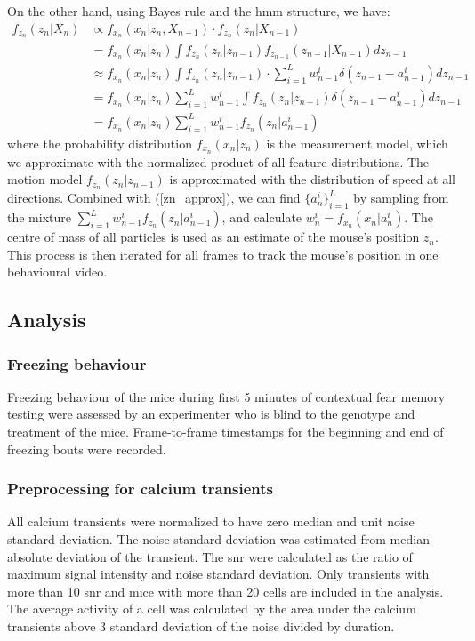 On the other hand, using Bayes rule and the \gls{hmm} structure, we have:
\begin{align*}
    f_{z_n}(z_n|X_n) &\propto f_{x_n}(x_n|z_n, X_{n-1}) \cdot f_{z_n}(z_n|X_{n-1}) \\
                     &= f_{x_n}(x_n|z_n) \int f_{z_n}(z_n|z_{n-1})f_{z_{n-1}}(z_{n-1}|X_{n-1})dz_{n-1}  \\
                     &\approx f_{x_n}(x_n|z_n) \int f_{z_n}(z_n|z_{n-1})\cdot \sum_{i=1}^Lw_{n-1}^i\delta(z_{n-1}-a_{n-1}^i)dz_{n-1} \\
                     &= f_{x_n}(x_n|z_n)  \sum_{i=1}^Lw_{n-1}^i \int f_{z_n}(z_n|z_{n-1})\delta(z_{n-1} - a_{n-1}^i)dz_{n-1} \\
                     &= f_{x_n}(x_n|z_n) \sum_{i=1}^Lw_{n-1}^if_{z_n}(z_n|a_{n-1}^i) 
\end{align*}
where the probability distribution $f_{x_n}(x_n|z_n)$ is the measurement model, which we approximate with the normalized product of all feature distributions. The motion model $f_{z_n}(z_n|z_{n-1})$ is approximated with the distribution of speed at all directions. Combined with (\ref{zn_approx}), we can find $\{a_n^i\}_{i=1}^L$ by sampling from the mixture $\sum_{i=1}^Lw_{n-1}^if_{z_n}(z_n|a_{n-1}^i)$, and calculate $w_n^i = f_{x_n}(x_n|a_n^i)$. The centre of mass of all particles is used as an estimate of the mouse's position $z_n$. This process is then iterated for all frames to track the mouse's position in one behavioural video.

\subsection{Analysis}

\subsubsection{Freezing behaviour}
Freezing behaviour of the mice during first 5 minutes of contextual fear memory testing were assessed by an experimenter who is blind to the genotype and treatment of the mice. Frame-to-frame timestamps for the beginning and end of freezing bouts were recorded.

\subsubsection{Preprocessing for calcium transients}

All calcium transients were normalized to have zero median and unit noise standard deviation. The noise standard deviation was estimated from median absolute deviation of the transient. The \gls{snr} were calculated as the ratio of maximum signal intensity and noise standard deviation. Only transients with more than 10 \gls{snr} and mice with more than 20 cells are included in the analysis. The average activity of a cell was calculated by the area under the calcium transients above 3 standard deviation of the noise divided by duration.

